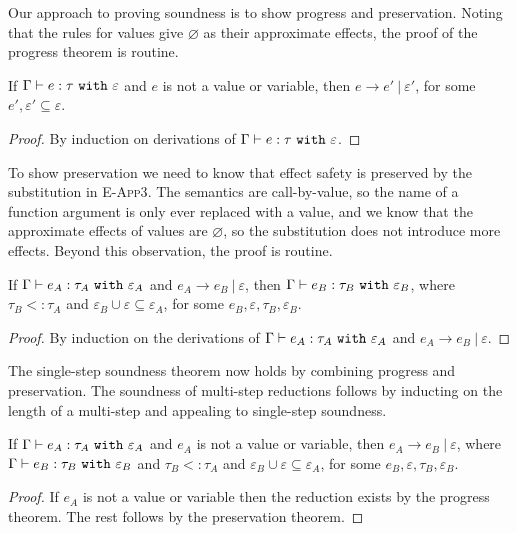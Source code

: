 Our approach to proving soundness is to show progress and preservation. Noting that the rules for values give $\varnothing$ as their approximate effects, the proof of the progress theorem is routine.

\begin{theorem}
If $ \Gamma \vdash  e:  \tau~\mathtt{with}~ \varepsilon$ and $ e$ is not a value or variable, then $ e \longrightarrow  e'~|~\varepsilon'$, for some $e', \varepsilon' \subseteq \varepsilon$.
\end{theorem}

\begin{proof} By induction on derivations of $ \Gamma \vdash  e:  \tau~\mathtt{with}~ \varepsilon$.
\end{proof}

To show preservation we need to know that effect safety is preserved by the substitution in \textsc{E-App3}. The semantics are call-by-value, so the name of a function argument is only ever replaced with a value, and we know that the approximate effects of values are $\varnothing$, so the substitution does not introduce more effects. Beyond this observation, the proof is routine.

\begin{theorem}
If $\Gamma \vdash e_A: \tau_A~\mathtt{with}~ \varepsilon_A$ and $e_A \longrightarrow e_B~|~\varepsilon$, then $\Gamma \vdash e_B: \tau_B~\mathtt{with}~ \varepsilon_B$, where $\tau_B <: \tau_A$ and $\varepsilon_B \cup \varepsilon \subseteq \varepsilon_A$, for some $e_B, \varepsilon, \tau_B, \varepsilon_B$.
\end{theorem}

\begin{proof}  By induction on the derivations of $\Gamma \vdash e_A: \tau_A~\mathtt{with}~ \varepsilon_A$ and $e_A \longrightarrow e_B~|~\varepsilon$.
\end{proof}

The single-step soundness theorem now holds by combining progress and preservation. The soundness of multi-step reductions follows by inducting on the length of a multi-step and appealing to single-step soundness.

\begin{theorem}
If $ \Gamma \vdash  e_A:  \tau_A~\mathtt{with}~ \varepsilon_A$ and $ e_A$ is not a value or variable, then $e_A \longrightarrow e_B~|~\varepsilon$, where $ \Gamma \vdash e_B:  \tau_B~\mathtt{with}~ \varepsilon_B$ and $ \tau_B <:  \tau_A$ and $\varepsilon_B \cup \varepsilon \subseteq \varepsilon_A$, for some $e_B, \varepsilon, \tau_B, \varepsilon_B$.
\end{theorem}
\begin{proof}
If $ e_A$ is not a value or variable then the reduction exists by the progress theorem. The rest follows by the preservation theorem.
\end{proof}

